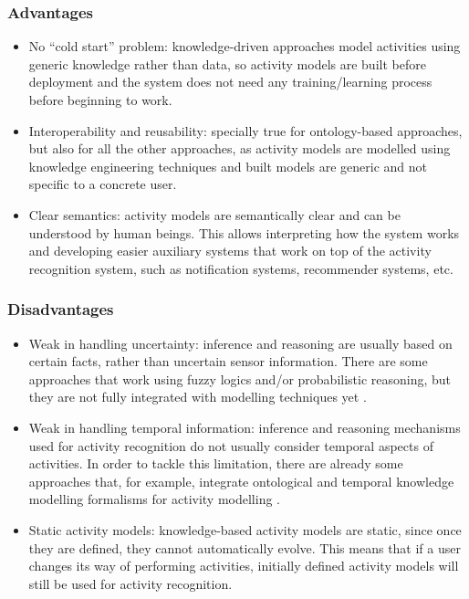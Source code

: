 \subsubsection*{Advantages}
\begin{itemize}
 \item No ``cold start'' problem: knowledge-driven approaches model activities using generic knowledge rather than data, so activity models are built before deployment and the system does not need any training/learning process before beginning to work.
 \item Interoperability and reusability: specially true for ontology-based approaches, but also for all the other approaches, as activity models are modelled using knowledge engineering techniques and built models are generic and not specific to a concrete user. 
 \item Clear semantics: activity models are semantically clear and can be understood by human beings. This allows interpreting how the system works and developing easier auxiliary systems that work on top of the activity recognition system, such as notification systems, recommender systems, etc. 
\end{itemize}

\subsubsection*{Disadvantages}
\begin{itemize}
 \item Weak in handling uncertainty: inference and reasoning are usually based on certain facts, rather than uncertain sensor information. There are some approaches that work using fuzzy logics and/or probabilistic reasoning, but they are not fully integrated with modelling techniques yet \cite{Helaoui2013} \cite{Almeida2012}.
 \item Weak in handling temporal information: inference and reasoning mechanisms used for activity recognition do not usually consider temporal aspects of activities. In order to tackle this limitation, there are already some approaches that, for example, integrate ontological and temporal knowledge modelling formalisms for activity modelling \cite{Okeyo2012}. 
 \item Static activity models: knowledge-based activity models are static, since once they are defined, they cannot automatically evolve. This means that if a user changes its way of performing activities, initially defined activity models will still be used for activity recognition.
\end{itemize}


